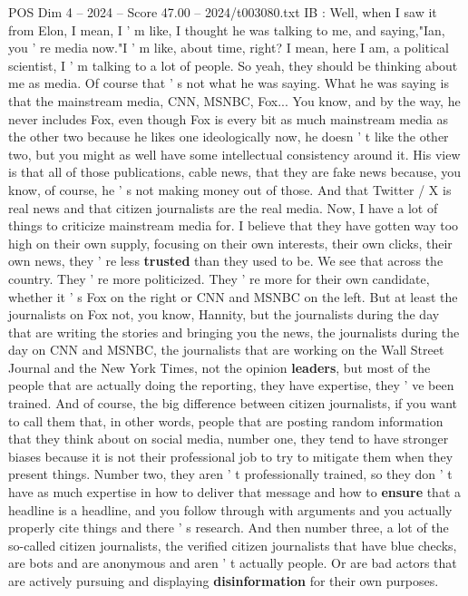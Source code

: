 \begin{textsample}{POS Dim 4 – 2024 – Score 47.00 – 2024/t003080.txt}
IB : Well, when I saw it from Elon, I mean, I ' m like, I thought he was talking to me, and saying,"Ian, you ' re media now."I ' m like, about time, right?
I mean, here I am, a political scientist, I ' m talking to a lot of people.
So yeah, they should be thinking about me as media.
Of course that ' s not what he was saying.
What he was saying is that the mainstream media, CNN, MSNBC, Fox...
You know, and by the way, he never includes Fox, even though Fox is every bit as much mainstream media as the other two because he likes one ideologically now, he doesn ' t like the other two, but you might as well have some intellectual consistency around it.
His view is that all of those publications, cable news, that they are fake news because, you know, of course, he ' s not making money out of those.
And that Twitter / X is real news and that citizen journalists are the real media.
Now, I have a lot of things to criticize mainstream media for.
I believe that they have gotten way too high on their own supply, focusing on their own interests, their own clicks, their own news, they ' re less \textbf{trusted} than they used to be.
We see that across the country.
They ' re more politicized.
They ' re more for their own candidate, whether it ' s Fox on the right or CNN and MSNBC on the left.
But at least the journalists on Fox not, you know, Hannity, but the journalists during the day that are writing the stories and bringing you the news, the journalists during the day on CNN and MSNBC, the journalists that are working on the Wall Street Journal and the New York Times, not the opinion \textbf{leaders}, but most of the people that are actually doing the reporting, they have expertise, they ' ve been trained.
And of course, the big difference between citizen journalists, if you want to call them that, in other words, people that are posting random information that they think about on social media, number one, they tend to have stronger biases because it is not their professional job to try to mitigate them when they present things.
Number two, they aren ' t professionally trained, so they don ' t have as much expertise in how to deliver that message and how to \textbf{ensure} that a headline is a headline, and you follow through with arguments and you actually properly cite things and there ' s research.
And then number three, a lot of the so-called citizen journalists, the verified citizen journalists that have blue checks, are bots and are anonymous and aren ' t actually people.
Or are bad actors that are actively pursuing and displaying \textbf{disinformation} for their own purposes.

\end{textsample}
